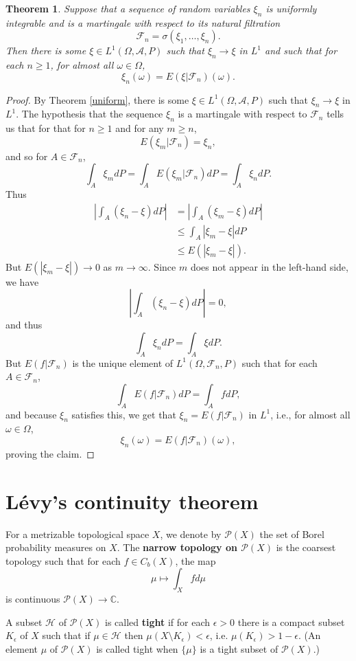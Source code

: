 \documentclass{article}
\newtheorem{theorem}{Theorem}
\theoremstyle{definition}
\begin{document}
\begin{theorem}
Suppose that a sequence of random variables $\xi_n$ is uniformly integrable and is a martingale with respect
to its natural filtration
\[
\mathscr{F}_n=\sigma(\xi_1,\ldots,\xi_n).
\]
Then there is some $\xi \in L^1(\Omega,\mathscr{A},P)$ such that $\xi_n \to \xi$ in $L^1$ and such that for each $n \geq 1$,
for almost all $\omega \in \Omega$,
\[
\xi_n(\omega) = E(\xi|\mathscr{F}_n)(\omega).
\]
\label{universal}
\end{theorem}
\begin{proof}
By Theorem \ref{uniform}, there is some $\xi \in L^1(\Omega,\mathscr{A},P)$ such that
$\xi_n \to \xi$ in $L^1$. 
The hypothesis that the sequence $\xi_n$ is a martingale with respect to $\mathscr{F}_n$ 
tells us that for 
that for $n \geq 1$ and for
any $m \geq n$,
\[
E(\xi_m|\mathscr{F}_n) = \xi_n,
\]
and so for $A \in \mathscr{F}_n$,
\[
\int_A \xi_m dP = \int_A  E(\xi_m|\mathscr{F}_n) dP = 
\int_A \xi_n dP.
\]
Thus
\begin{align*}
\left| \int_A (\xi_n - \xi) dP \right|&=\left| \int_A (\xi_m - \xi) dP \right|\\
&\leq \int_A |\xi_m-\xi| dP\\
&\leq E(|\xi_m-\xi|).
\end{align*}
But $E(|\xi_m-\xi|) \to 0$ as $m \to \infty$. Since $m$ does not appear in the left-hand side, we have
\[
\left| \int_A (\xi_n - \xi) dP \right| = 0,
\]
and thus
\[
\int_A \xi_n dP = \int_A \xi dP.
\]
But $E(f|\mathscr{F}_n)$ is the unique element of $L^1(\Omega,\mathscr{F}_n,P)$ such that for
each $A \in \mathscr{F}_n$,
\[
\int_A E(f|\mathscr{F}_n) dP = \int_A f dP,
\]
and because $\xi_n$ satisfies this, we get that $\xi_n = E(f|\mathscr{F}_n)$ in $L^1$, i.e., 
for almost all $\omega \in \Omega$,
\[
\xi_n(\omega) = E(f|\mathscr{F}_n)(\omega),
\]
proving the claim.
\end{proof}




\section{Lévy's continuity theorem}
For a metrizable topological space $X$, we denote by $\mathscr{P}(X)$ the set of Borel
probability measures on $X$. The \textbf{narrow topology on $\mathscr{P}(X)$} is the coarsest topology
such that for each $f \in C_b(X)$, the map
\[
\mu \mapsto \int_X f d\mu
\]
is continuous $\mathscr{P}(X) \to \mathbb{C}$. 

A subset $\mathscr{H}$ of $\mathscr{P}(X)$ is called \textbf{tight} if for each $\epsilon>0$ there is a compact
subset $K_\epsilon$ of $X$ such that if $\mu \in \mathscr{H}$ then
$\mu(X \setminus K_\epsilon) < \epsilon$, i.e. $\mu(K_\epsilon)>1-\epsilon$. (An element $\mu$ of $\mathscr{P}(X)$ is called tight
when $\{\mu\}$ is a tight subset of $\mathscr{P}(X)$.)
\end{document}
